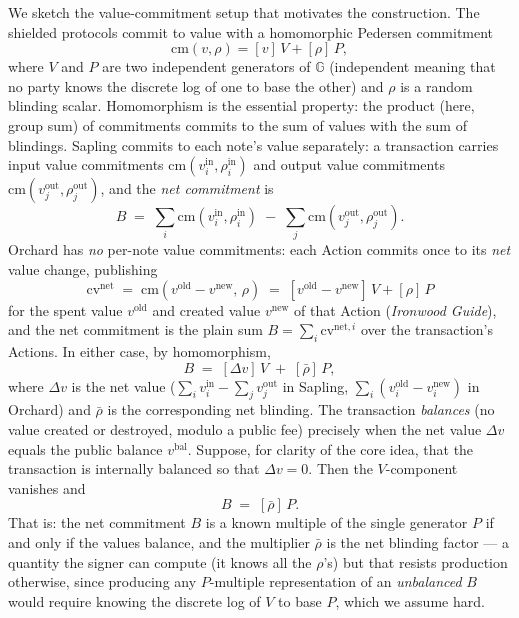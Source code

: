\documentclass[11pt,a4paper]{article}
\theoremstyle{definition}
\theoremstyle{remark}
\newcommand{\G}{\ensuremath{\mathbb{G}}}
\begin{document}
We sketch the value-commitment setup that motivates the construction. The shielded protocols commit to value with a homomorphic Pedersen commitment
\[
  \mathrm{cm}(v, \rho) = [v]\,V + [\rho]\,P,
\]
where \(V\) and \(P\) are two independent generators of \(\G\) (independent meaning that no party knows the discrete log of one to base the other) and \(\rho\) is a random blinding scalar. Homomorphism is the essential property: the product (here, group sum) of commitments commits to the sum of values with the sum of blindings. Sapling commits to each note's value separately: a transaction carries input value commitments \(\mathrm{cm}(v_i^{\mathrm{in}}, \rho_i^{\mathrm{in}})\) and output value commitments \(\mathrm{cm}(v_j^{\mathrm{out}}, \rho_j^{\mathrm{out}})\), and the \emph{net commitment} is
\[
  B \;=\; \sum_i \mathrm{cm}(v_i^{\mathrm{in}}, \rho_i^{\mathrm{in}}) \;-\; \sum_j \mathrm{cm}(v_j^{\mathrm{out}}, \rho_j^{\mathrm{out}}).
\]
Orchard has \emph{no} per-note value commitments: each Action commits once to its \emph{net} value change, publishing
\[
  \mathrm{cv}^{\mathrm{net}} \;=\; \mathrm{cm}(v^{\mathrm{old}} - v^{\mathrm{new}},\, \rho) \;=\; [v^{\mathrm{old}} - v^{\mathrm{new}}]\,V + [\rho]\,P
\]
for the spent value \(v^{\mathrm{old}}\) and created value \(v^{\mathrm{new}}\) of that Action (\emph{Ironwood Guide}), and the net commitment is the plain sum \(B = \sum_i \mathrm{cv}^{\mathrm{net},i}\) over the transaction's Actions. In either case, by homomorphism,
\[
  B \;=\; [\Delta v]\,V \;+\; [\bar\rho]\,P,
\]
where \(\Delta v\) is the net value (\(\sum_i v_i^{\mathrm{in}} - \sum_j v_j^{\mathrm{out}}\) in Sapling, \(\sum_i (v_i^{\mathrm{old}} - v_i^{\mathrm{new}})\) in Orchard) and \(\bar\rho\) is the corresponding net blinding. The transaction \emph{balances} (no value created or destroyed, modulo a public fee) precisely when the net value \(\Delta v\) equals the public balance \(v^{\mathrm{bal}}\). Suppose, for clarity of the core idea, that the transaction is internally balanced so that \(\Delta v = 0\). Then the \(V\)-component vanishes and
\[
  B \;=\; [\bar\rho]\,P.
\]
That is: the net commitment \(B\) is a known multiple of the single generator \(P\) if and only if the values balance, and the multiplier \(\bar\rho\) is the net blinding factor — a quantity the signer can compute (it knows all the \(\rho\)'s) but that resists production otherwise, since producing any \(P\)-multiple representation of an \emph{unbalanced} \(B\) would require knowing the discrete log of \(V\) to base \(P\), which we assume hard.
\end{document}
